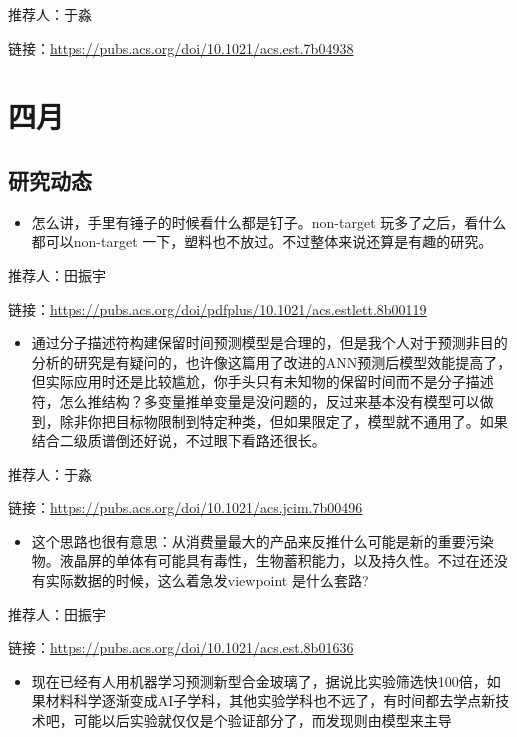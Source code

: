 \documentclass[]{book}
\providecommand{\tightlist}{%
  \setlength{\itemsep}{0pt}\setlength{\parskip}{0pt}}
\begin{document}
推荐人：于淼

链接：\url{https://pubs.acs.org/doi/10.1021/acs.est.7b04938}

\section*{四月}

\subsection*{研究动态}\label{-5}

\begin{itemize}
\tightlist
\item
  怎么讲，手里有锤子的时候看什么都是钉子。non-target
  玩多了之后，看什么都可以non-target
  一下，塑料也不放过。不过整体来说还算是有趣的研究。
\end{itemize}

推荐人：田振宇

链接：\url{https://pubs.acs.org/doi/pdfplus/10.1021/acs.estlett.8b00119}

\begin{itemize}
\tightlist
\item
  通过分子描述符构建保留时间预测模型是合理的，但是我个人对于预测非目的分析的研究是有疑问的，也许像这篇用了改进的ANN预测后模型效能提高了，但实际应用时还是比较尴尬，你手头只有未知物的保留时间而不是分子描述符，怎么推结构？多变量推单变量是没问题的，反过来基本没有模型可以做到，除非你把目标物限制到特定种类，但如果限定了，模型就不通用了。如果结合二级质谱倒还好说，不过眼下看路还很长。
\end{itemize}

推荐人：于淼

链接：\url{https://pubs.acs.org/doi/10.1021/acs.jcim.7b00496}

\begin{itemize}
\tightlist
\item
  这个思路也很有意思：从消费量最大的产品来反推什么可能是新的重要污染物。液晶屏的单体有可能具有毒性，生物蓄积能力，以及持久性。不过在还没有实际数据的时候，这么着急发viewpoint
  是什么套路?
\end{itemize}

推荐人：田振宇

链接：\url{https://pubs.acs.org/doi/10.1021/acs.est.8b01636}

\begin{itemize}
\tightlist
\item
  现在已经有人用机器学习预测新型合金玻璃了，据说比实验筛选快100倍，如果材料科学逐渐变成AI子学科，其他实验学科也不远了，有时间都去学点新技术吧，可能以后实验就仅仅是个验证部分了，而发现则由模型来主导
\end{itemize}
\end{document}

